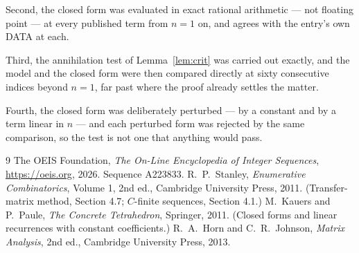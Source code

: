 \documentclass[11pt,a4paper]{article}
\theoremstyle{plain}
\theoremstyle{definition}
\begin{document}
Second, the closed form was evaluated in exact rational arithmetic --- not floating point ---
at every published term from $n=1$ on, and agrees with the entry's own DATA at each.

Third, the annihilation test of Lemma~\ref{lem:crit} was carried out exactly, and the model
and the closed form were then compared directly at sixty consecutive indices beyond
$n=1$, far past where the proof already settles the matter.

Fourth, the closed form was deliberately perturbed --- by a constant and by a term linear in
$n$ --- and each perturbed form was rejected by the same comparison, so the test is not one
that anything would pass.

\begin{thebibliography}{9}
 The OEIS Foundation, \emph{The On-Line Encyclopedia of Integer
Sequences}, \url{https://oeis.org}, 2026. Sequence A223833.
 R.~P.~Stanley, \emph{Enumerative Combinatorics}, Volume 1, 2nd ed.,
Cambridge University Press, 2011. (Transfer-matrix method, Section 4.7; $C$-finite sequences,
Section 4.1.)
 M.~Kauers and P.~Paule, \emph{The Concrete Tetrahedron}, Springer, 2011.
(Closed forms and linear recurrences with constant coefficients.)
 R.~A.~Horn and C.~R.~Johnson, \emph{Matrix Analysis}, 2nd ed., Cambridge
University Press, 2013.
\end{thebibliography}
\end{document}
